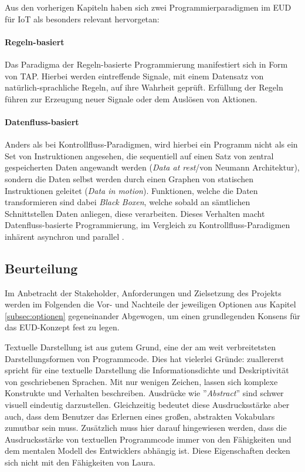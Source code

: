 Aus den vorherigen Kapiteln haben sich zwei Programmierparadigmen im \ac{EUD} für \ac{IoT} als besonders relevant hervorgetan:

\paragraph{Regeln-basiert} Das Paradigma der Regeln-basierte Programmierung manifestiert sich in Form von \ac{TAP}. Hierbei werden eintreffende Signale, mit einem Datensatz von natürlich-sprachliche Regeln, auf ihre Wahrheit geprüft. Erfüllung der Regeln führen zur Erzeugung neuer Signale oder dem Auslösen von Aktionen. 
\paragraph{Datenfluss-basiert} Anders als bei Kontrollfluss-Paradigmen, wird hierbei ein Programm nicht als ein Set von Instruktionen angesehen, die sequentiell auf einen Satz von zentral gespeicherten Daten angewandt werden (\textit{Data at rest}/von Neumann Architektur), sondern die Daten selbst werden durch einen Graphen von statischen Instruktionen geleitet (\textit{Data in motion}). Funktionen, welche die Daten transformieren sind dabei \textit{Black Boxen}, welche sobald an sämtlichen Schnittstellen Daten anliegen, diese verarbeiten. Dieses Verhalten macht Datenfluss-basierte Programmierung, im Vergleich zu Kontrollfluss-Paradigmen inhärent asynchron und parallel \cite{johnston2004advances}.

\subsection{Beurteilung}
Im Anbetracht der Stakeholder, Anforderungen und Zielsetzung des Projekts werden im Folgenden die Vor- und Nachteile der jeweiligen Optionen aus Kapitel \ref{subsec:optionen} gegeneinander Abgewogen, um einen grundlegenden Konsens für das \ac{EUD}-Konzept fest zu legen.

Textuelle Darstellung ist aus gutem Grund, eine der am weit verbreitetsten Darstellungsformen von Programmcode. Dies hat vielerlei Gründe: zuallererst spricht für eine textuelle Darstellung die Informationsdichte und Deskriptivität von geschriebenen Sprachen. Mit nur wenigen Zeichen, lassen sich komplexe Konstrukte und Verhalten beschreiben. Ausdrücke wie ''\textit{Abstract}'' sind schwer visuell eindeutig darzustellen.  Gleichzeitig bedeutet diese Ausdrucksstärke aber auch, dass dem Benutzer das Erlernen eines großen, abstrakten Vokabulars zumutbar sein muss. Zusätzlich muss hier darauf hingewiesen werden, dass die Ausdrucksstärke von textuellen Programmcode immer von den Fähigkeiten und dem mentalen Modell des Entwicklers abhängig ist. Diese Eigenschaften decken sich nicht mit den Fähigkeiten von Laura.

